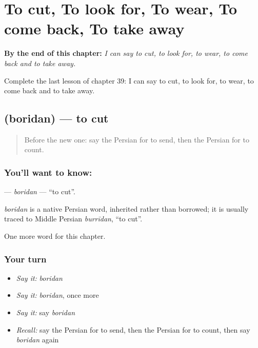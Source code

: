 
\chapter{To cut, To look for, To wear, To come back, To take away}
\label{ch:fa-to-cut-to-look-for-to-wear-to-come-back-to-take-away}

\begin{chapteropening}
\textbf{By the end of this chapter:} \emph{I can say to cut, to look for, to wear, to come back and to take away.}

Complete the last lesson of chapter 39: I can say to cut, to look for, to wear, to come back and to take away.
\end{chapteropening}

\section[\texorpdfstring{\fa{بریدن} (boridan)}{بریدن (boridan)}]{ (boridan) — to cut}

\label{lesson:FA-C39-boridan}



\begin{quote}
Before the new one: say the Persian for to send, then the Persian for to count.
\end{quote}

\subsection*{You'll want to know: }
\textbf{} — \emph{boridan} — \textquotedblleft{}to cut\textquotedblright{}.

\begin{cousinweb}
\emph{boridan} is a native Persian word, inherited rather than borrowed; it is usually traced to Middle Persian \emph{burrīdan}, \textquotedblleft{}to cut\textquotedblright{}.
\end{cousinweb}

\begin{grammarlens}[title={What you've built}]
One more word for this chapter.
\end{grammarlens}

\subsection*{Your turn}
\begin{itemize}
\raggedright
  \item \emph{Say it:} \emph{boridan}
  \item \emph{Say it:} \emph{boridan}, once more
  \item \emph{Say it:} say \emph{boridan}
  \item \emph{Recall:} say the Persian for to send, then the Persian for to count, then say \emph{boridan} again
\end{itemize}

